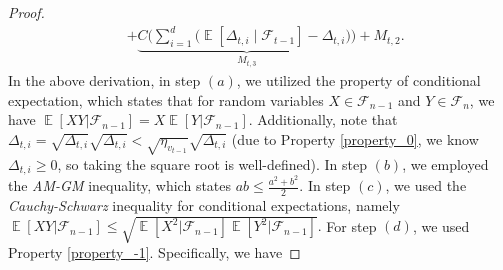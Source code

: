 \documentclass{article} %
\DeclareMathOperator{\Expect}{\mathbb{E}}
\begin{document}
\begin{proof}
\begin{align}
&+\underbrace{C\Bigg(\sum_{i=1}^{d}\Big(\Expect[\Delta_{t,i}\mid\mathscr{F}_{t-1}]-\Delta_{t,i}\Big)\Bigg)}_{M_{t,3}}+M_{t,2}.
\end{align}
In the above derivation, in step $(a)$, we utilized the property of conditional expectation, which states that for random variables \(X \in \mathscr{F}_{n-1}\) and \(Y \in \mathscr{F}_{n}\), we have \(\Expect[XY|\mathscr{F}_{n-1}] = X\Expect[Y|\mathscr{F}_{n-1}]\). Additionally, note that \(\Delta_{t,i} = \sqrt{\Delta_{t,i}}\sqrt{\Delta_{t,i}} < \sqrt{\eta_{v_{t-1}}}\sqrt{\Delta_{t,i}}\) (due to Property \ref{property_0}, we know \(\Delta_{t,i} \ge 0\), so taking the square root is well-defined). In step $(b)$, we employed the \emph{AM-GM} inequality, which states \(ab \le \frac{a^{2} + b^{2}}{2}\). In step $(c)$, we used the \emph{Cauchy-Schwarz} inequality for conditional expectations, namely \(\Expect[XY|\mathscr{F}_{n-1}] \le \sqrt{\Expect[X^{2}|\mathscr{F}_{n-1}] \Expect[Y^{2}|\mathscr{F}_{n-1}]}.\) For step $(d)$, we used Property \ref{property_-1}. Specifically, we have

\end{proof}
\end{document}
